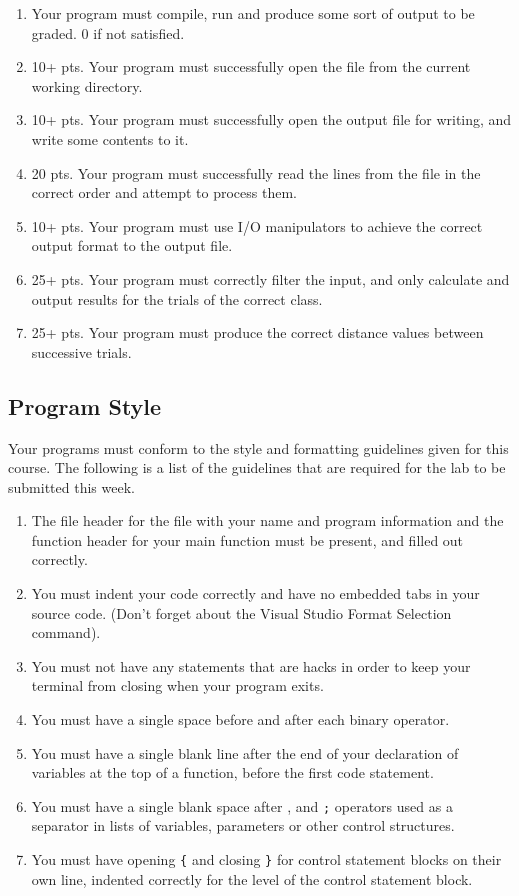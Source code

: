 \documentclass[11pt]{article}
\begin{document}
\begin{enumerate}
\item Your program must compile, run and produce some sort of output to be
graded. 0 if not satisfied.
\item 10+ pts. Your program must successfully open the file from the current
working directory.
\item 10+ pts. Your program must successfully open the output file for writing, and
write some contents to it.
\item 20 pts. Your program must successfully read the lines from the file in the
correct order and attempt to process them.
\item 10+ pts. Your program must use I/O manipulators to achieve the correct output
format to the output file.
\item 25+ pts. Your program must correctly filter the input, and only calculate and
output results for the trials of the correct class.
\item 25+ pts. Your program must produce the correct distance values between successive
trials.
\end{enumerate}


\subsection*{Program Style}
\label{sec-5-2}

Your programs must conform to the style and formatting guidelines given for this course.
The following is a list of the guidelines that are required for the lab to be submitted
this week.

\begin{enumerate}
\item The file header for the file with your name and program information
and the function header for your main function must be present, and
filled out correctly.
\item You must indent your code correctly and have no embedded tabs in
your source code. (Don't forget about the Visual Studio Format
Selection command).
\item You must not have any statements that are hacks in order to keep
your terminal from closing when your program exits.
\item You must have a single space before and after each binary operator.
\item You must have a single blank line after the end of your declaration
of variables at the top of a function, before the first code
statement.
\item You must have a single blank space after , and \verb~;~ operators used as a
separator in lists of variables, parameters or other control
structures.
\item You must have opening \verb~{~ and closing \verb~}~ for control statement blocks
on their own line, indented correctly for the level of the control
statement block.
\end{enumerate}
\end{document}
